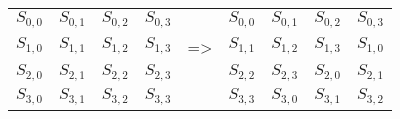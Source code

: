 \begin{tabular}{|c|c|c|c|l|l|l|l|l|}
  \cline{1-4} \cline{6-9}
  $S_{0,0}$ & $S_{0,1}$ & $S_{0,2}$ & $S_{0,3}$ &  & $S_{0,0}$ & $S_{0,1}$ & $S_{0,2}$ & $S_{0,3}$ \\ \cline{1-4} \cline{6-9} 
  \cellcolor[HTML]{FFCCC9}$S_{1,0}$ & \cellcolor[HTML]{9AFF99}$S_{1,1}$ & \cellcolor[HTML]{96FFFB}$S_{1,2}$ & \cellcolor[HTML]{CBCEFB}$S_{1,3}$ & =\textgreater{} & \cellcolor[HTML]{9AFF99}$S_{1,1}$ & \cellcolor[HTML]{96FFFB}$S_{1,2}$ & \cellcolor[HTML]{CBCEFB}$S_{1,3}$ & \cellcolor[HTML]{FFCCC9}$S_{1,0}$ \\ \cline{1-4} \cline{6-9} 
  \cellcolor[HTML]{FFCCC9}$S_{2,0}$ & \cellcolor[HTML]{9AFF99}$S_{2,1}$ & \cellcolor[HTML]{96FFFB}$S_{2,2}$ & \cellcolor[HTML]{CBCEFB}$S_{2,3}$ &  & \cellcolor[HTML]{96FFFB}$S_{2,2}$ & \cellcolor[HTML]{CBCEFB}$S_{2,3}$ & \cellcolor[HTML]{FFCCC9}$S_{2,0}$ & \cellcolor[HTML]{9AFF99}$S_{2,1}$ \\ \cline{1-4} \cline{6-9} 
  \cellcolor[HTML]{FFCCC9}$S_{3,0}$ & \cellcolor[HTML]{9AFF99}$S_{3,1}$ & \cellcolor[HTML]{96FFFB}$S_{3,2}$ & \cellcolor[HTML]{CBCEFB}$S_{3,3}$ &  & \cellcolor[HTML]{CBCEFB}$S_{3,3}$ & \cellcolor[HTML]{FFCCC9}$S_{3,0}$ & \cellcolor[HTML]{9AFF99}$S_{3,1}$ & \cellcolor[HTML]{96FFFB}$S_{3,2}$ \\ \cline{1-4} \cline{6-9} 
\end{tabular}